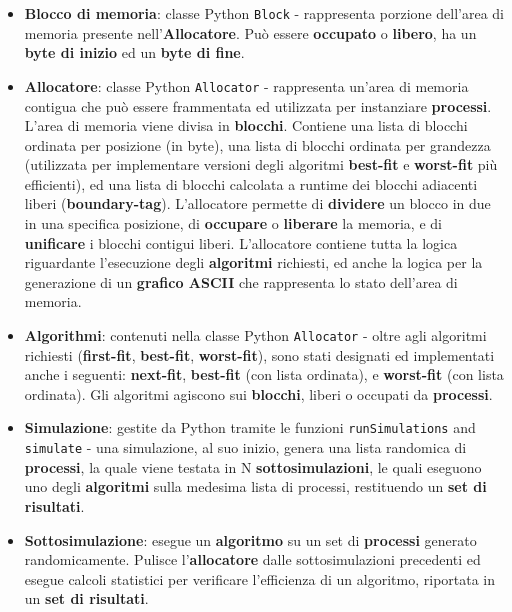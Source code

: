 \documentclass[12pt]{report}
\renewcommand\emph{\textbf}
\begin{document}
        \begin{itemize}
            \item \emph{Blocco di memoria}: classe Python \texttt{Block} - rappresenta porzione dell'area di memoria presente nell'\emph{Allocatore}. Può essere \emph{occupato} o \emph{libero}, ha un \emph{byte di inizio} ed un \emph{byte di fine}.
            \item \emph{Allocatore}: classe Python \texttt{Allocator} - rappresenta un'area di memoria contigua che può essere frammentata ed utilizzata per instanziare \emph{processi}. L'area di memoria viene divisa in \emph{blocchi}.  Contiene una lista di blocchi ordinata per posizione (in byte), una lista di blocchi ordinata per grandezza (utilizzata per implementare versioni degli algoritmi \emph{best-fit} e \emph{worst-fit} più efficienti), ed una lista di blocchi calcolata a runtime dei blocchi adiacenti liberi (\emph{boundary-tag}). 
            L'allocatore permette di \emph{dividere} un blocco in due in una specifica posizione, di \emph{occupare} o \emph{liberare} la memoria, e di \emph{unificare} i blocchi contigui liberi.
            L'allocatore contiene tutta la logica riguardante l'esecuzione degli \emph{algoritmi} richiesti, ed anche la logica per la generazione di un \emph{grafico ASCII} che rappresenta lo stato dell'area di memoria.
            \item \emph{Algorithmi}: contenuti nella classe Python \texttt{Allocator} - oltre agli algoritmi richiesti (\emph{first-fit}, \emph{best-fit}, \emph{worst-fit}), sono stati designati ed implementati anche i seguenti: \emph{next-fit}, \emph{best-fit} (con lista ordinata), e \emph{worst-fit} (con lista ordinata).
            Gli algoritmi agiscono sui \emph{blocchi}, liberi o occupati da \emph{processi}.
            \item \emph{Simulazione}: gestite da Python tramite le funzioni \texttt{runSimulations} and \texttt{simulate} - una simulazione, al suo inizio, genera una lista randomica di \emph{processi}, la quale viene testata in N \emph{sottosimulazioni}, le quali eseguono uno degli \emph{algoritmi} sulla medesima lista di processi, restituendo un \emph{set di risultati}.
            \item \emph{Sottosimulazione}: esegue un \emph{algoritmo} su un set di \emph{processi} generato randomicamente. Pulisce l'\emph{allocatore} dalle sottosimulazioni precedenti ed esegue calcoli statistici per verificare l'efficienza di un algoritmo, riportata in un \emph{set di risultati}.

\end{itemize}
\end{document}
